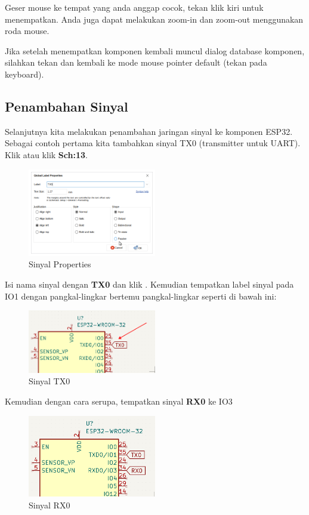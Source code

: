 \documentclass[12pt]{book}
\begin{document}
	Geser mouse ke tempat yang anda anggap cocok, tekan klik kiri untuk menempatkan.
	Anda juga dapat melakukan zoom-in dan zoom-out menggunakan roda mouse.

	Jika setelah menempatkan komponen kembali muncul dialog database komponen, silahkan tekan 
	dan kembali ke mode mouse pointer default (tekan  pada keyboard).

	\newpage
	\subsection{Penambahan Sinyal}

	Selanjutnya kita melakukan penambahan jaringan sinyal ke komponen ESP32.
	Sebagai contoh pertama kita tambahkan sinyal TX0 (transmitter untuk UART).
	Klik  atau klik \textbf{Sch:13}.

	\begin{figure}[!ht]
		\centering
		\includegraphics[width=0.5\textwidth]{images/sch/sch_4}
		\caption{Sinyal Properties}
	\end{figure}

	Isi nama sinyal dengan \textbf{TX0} dan klik .
	Kemudian tempatkan label sinyal pada IO1 dengan pangkal-lingkar bertemu pangkal-lingkar seperti di bawah ini:

	\begin{figure}[!ht]
		\centering
		\includegraphics[width=0.5\textwidth]{images/sch/sch_5}
		\caption{Sinyal TX0}
	\end{figure}

	Kemudian dengan cara serupa, tempatkan sinyal \textbf{RX0} ke IO3

	\begin{figure}[!ht]
		\centering
		\includegraphics[width=0.5\textwidth]{images/sch/sch_6}
		\caption{Sinyal RX0}
	\end{figure}
\end{document}
